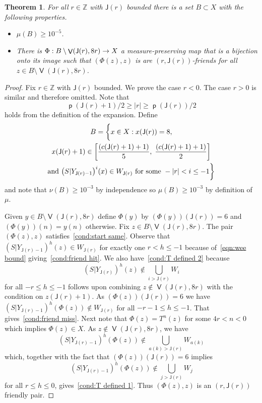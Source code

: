 \documentclass[10pt]{amsart}
\newtheorem{theo}{Theorem}[section]
\theoremstyle{definition}\newtheorem{defi}[theo]{Definition}\newtheorem{rema}[theo]{Remark}\newtheorem{exam}[theo]{Example}\newtheorem{exem}[theo]{Example}\newtheorem{nota}[theo]{Notation}
\DeclareMathOperator{\bad}{\mathsf{V}}
\DeclareMathOperator{\p}{\mathsf{p}}
\newcommand{\Z}{\mathbb{Z}}
\newcommand{\scl}{\mathsf{J}}
\let\originalleft\left
\let\originalright\right
\renewcommand{\left}{\mathopen{}\mathclose\bgroup\originalleft}
\renewcommand{\right}{\aftergroup\egroup\originalright}
\renewcommand*{\to}{\mathchoice{\longrightarrow}{\rightarrow}{\rightarrow}{\rightarrow}}
\begin{document}
\begin{theo}\label{thm:bounded wfriends}
For all $r \in \Z$ with $\scl(r)$ bounded there is a set $B \subset X$ with the following properties.
\begin{itemize}
\item $\mu(B) \ge 10^{-5}$.
\item There is $\Phi : B \setminus \bad(\scl(r),8r) \to X$ a measure-preserving map that is a bijection onto its image such that $(\Phi(z), z)$ is are $(r,\scl(r))$-friends for all $z \in B \setminus \bad(\scl(r),8r)$.
\end{itemize}
\end{theo}

\begin{proof}
Fix $r \in \Z$ with $\scl(r)$ bounded. We prove the case $r < 0$. The case $r > 0$ is similar and therefore omitted. Note that
\begin{equation}\label{eqn:wee bound}
\p(\scl(r)+1)/2\ge|r| \ge \p(\scl(r)) / 2
\end{equation}
holds from the definition of the expansion. Define
\begin{multline}\label{eqn:Bset}
B = \biggl\{ x \in X : x(\scl(r)) = 8,\\
x(\scl(r)+1)\in \left[\frac{(c(\scl(r)+1)+1)}{5},\;\frac{(c(\scl(r)+1)+1)}{2}
\right] \\
\text{and } \left(S|Y_{\scl(r)-1}\right)^i(x) \in W_{\scl(r)} \text{ for some } -|r| < i \le -1 \biggr\}
\end{multline}
and note that $\nu(B) \ge 10^{-3}$ by independence so $\mu(B) \ge 10^{-3}$ by definition of $\mu$.

Given $y \in B \setminus \bad(\scl(r),8r)$ define $\Phi(y)$ by $(\Phi(y))(\scl(r)) = 6$ and $(\Phi(y))(n) = y(n)$ otherwise. Fix $z \in B \setminus \bad(\scl(r),8r)$. The pair $(\Phi(z),z)$ satisfies~\eqref{cond:start same}. Observe that $(S|Y_{\scl(r)-1})^h(z) \in W_{\scl(r)}$ for exactly one $r< h\leq-1$ because of~\eqref{eqn:wee bound} giving~\eqref{cond:friend hit}. We also have~\eqref{cond:T defined 2} because
\[
(S|Y_{\scl(r)})^h(z) \notin \bigcup_{i>\scl(r)} W_i
\]
for all $-r \le h \le -1$ follows upon combining $z \notin \bad(\scl(r),8r)$ with the condition on $z(\scl(r) + 1)$. As $(\Phi(z))(\scl(r)) = 6$ we have $(S|Y_{\scl(r)-1})^h(\Phi(z)) \notin W_{\scl(r)}$ for all $-r-1 \le h \le -1$. That gives~\eqref{cond:friend miss}. Next note that $\Phi(z) = T^n(z)$ for some $4r<n<0$ which implies $\Phi(z) \in X$. As $z \notin \bad(\scl(r),8r)$, we have
\[
(S|Y_{\scl(r)-1})^h(\Phi(z)) \notin \bigcup_{a(k)>\scl(r)}W_{a(k)}
\]
which, together with the fact that $(\Phi(z))(\scl(r)) = 6$ implies
\[
(S|Y_{\scl(r)-1})^h(\Phi(z)) \notin \bigcup_{j>\scl(r)} W_j
\]
for all $r \le h \le 0$, gives~\eqref{cond:T defined 1}. Thus $(\Phi(z),z)$ is an $(r,\scl(r))$ friendly pair.
\end{proof}
\end{document}
